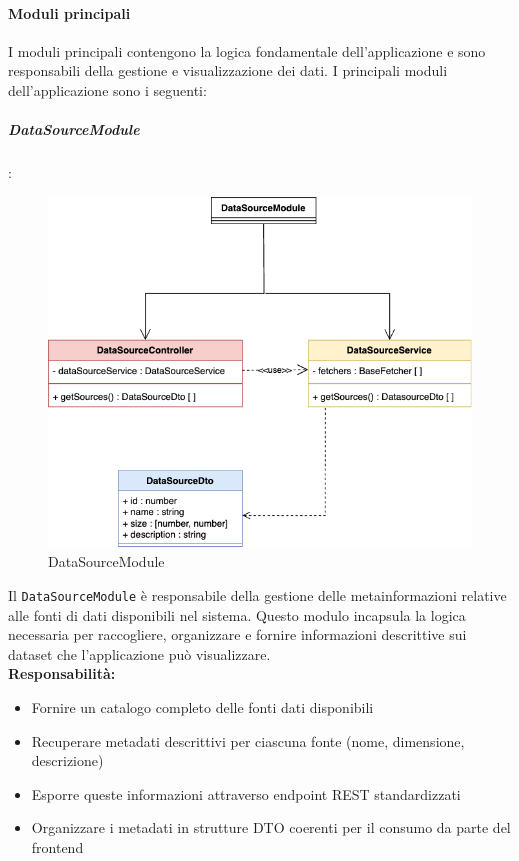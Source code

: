 \paragraph{Moduli principali}
I moduli principali contengono la logica fondamentale dell'applicazione e sono responsabili della gestione e visualizzazione dei dati. I principali moduli dell'applicazione sono i seguenti:

\subparagraph{DataSourceModule}: 

\begin{figure}[H] 
    \centering
    \includegraphics[scale = 0.4]{template/images/uml_back/DataSourceModule.png}
    \caption{DataSourceModule}
\end{figure}

Il \texttt{DataSourceModule} è responsabile della gestione delle metainformazioni relative alle fonti di dati disponibili nel sistema. Questo modulo incapsula la logica necessaria per raccogliere, organizzare e fornire informazioni descrittive sui dataset che l'applicazione può visualizzare.\\

\textbf{Responsabilità:}
\begin{itemize}
    \item Fornire un catalogo completo delle fonti dati disponibili
    \item Recuperare metadati descrittivi per ciascuna fonte (nome, dimensione, descrizione)
    \item Esporre queste informazioni attraverso endpoint REST standardizzati
    \item Organizzare i metadati in strutture DTO coerenti per il consumo da parte del frontend
\end{itemize}

